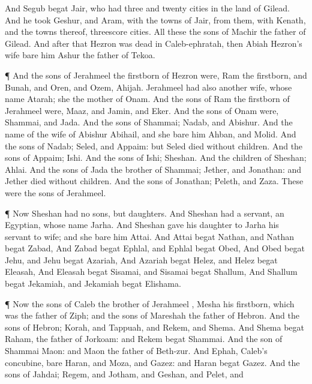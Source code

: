 {And
Segub
begat
Jair, who had
three and
twenty
cities in the
land of
Gilead.
And he
took
Geshur, and
Aram, with the
towns of
Jair, from them, with
Kenath, and the
towns thereof,
{}
threescore
cities. All these
{} the
sons of
Machir the
father of
Gilead.
And
after that
Hezron was
dead in
Caleb-ephratah, then
Abiah
Hezron’s
wife
bare him
Ashur the
father of
Tekoa.
\par }{\PP {}¶ And the
sons of
Jerahmeel the
firstborn of
Hezron were,
Ram the
firstborn, and
Bunah, and
Oren, and
Ozem,
{}
Ahijah.
Jerahmeel had also
another
wife, whose
name
{}
Atarah; she
{} the
mother of
Onam.
And the
sons of
Ram the
firstborn of
Jerahmeel were,
Maaz, and
Jamin, and
Eker.
And the
sons of
Onam were,
Shammai, and
Jada. And the
sons of
Shammai;
Nadab, and
Abishur.
And the
name of the
wife of
Abishur
{}
Abihail, and she
bare him
Ahban, and
Molid.
And the
sons of
Nadab;
Seled, and
Appaim: but
Seled
died without
children.
And the
sons of
Appaim;
Ishi. And the
sons of
Ishi;
Sheshan. And the
children of
Sheshan;
Ahlai.
And the
sons of
Jada the
brother of
Shammai;
Jether, and
Jonathan: and
Jether
died without
children.
And the
sons of
Jonathan;
Peleth, and
Zaza. These were the
sons of
Jerahmeel.
\par }{\PP {}¶ Now
Sheshan had no
sons, but
daughters. And
Sheshan had a
servant, an
Egyptian, whose
name
{}
Jarha.
And
Sheshan
gave his
daughter to
Jarha his
servant to
wife; and she
bare him
Attai.
And
Attai
begat
Nathan, and
Nathan
begat
Zabad,
And
Zabad
begat
Ephlal, and
Ephlal
begat
Obed,
And
Obed
begat
Jehu, and
Jehu
begat
Azariah,
And
Azariah
begat
Helez, and
Helez
begat
Eleasah,
And
Eleasah
begat
Sisamai, and
Sisamai
begat
Shallum,
And
Shallum
begat
Jekamiah, and
Jekamiah
begat
Elishama.
\par }{\PP {}¶ Now the
sons of
Caleb the
brother of
Jerahmeel
{},
Mesha his
firstborn, which was the
father of
Ziph; and the
sons of
Mareshah the
father of
Hebron.
And the
sons of
Hebron;
Korah, and
Tappuah, and
Rekem, and
Shema.
And
Shema
begat
Raham, the
father of
Jorkoam: and
Rekem
begat
Shammai.
And the
son of
Shammai
{}
Maon: and
Maon
{} the
father of
Beth-zur.
And
Ephah,
Caleb’s
concubine,
bare
Haran, and
Moza, and
Gazez: and
Haran
begat
Gazez.
And the
sons of
Jahdai;
Regem, and
Jotham, and
Geshan, and
Pelet, and
}
